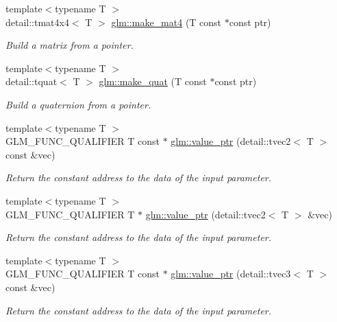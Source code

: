 \begin{DoxyCompactItemize}
{\footnotesize template$<$typename T $>$ }\\detail\-::tmat4x4$<$ T $>$ \hyperlink{group__gtc__type__ptr_ga723dd6241d4edf2ad48b25e5007054a7}{glm\-::make\-\_\-mat4} (T const $\ast$const ptr)
\begin{DoxyCompactList}\small\item\em Build a matrix from a pointer. \end{DoxyCompactList}\item 
{\footnotesize template$<$typename T $>$ }\\detail\-::tquat$<$ T $>$ \hyperlink{group__gtc__type__ptr_ga341b6592d08bc2e3871ceec05e0c060d}{glm\-::make\-\_\-quat} (T const $\ast$const ptr)
\begin{DoxyCompactList}\small\item\em Build a quaternion from a pointer. \end{DoxyCompactList}\item 
{\footnotesize template$<$typename T $>$ }\\G\-L\-M\-\_\-\-F\-U\-N\-C\-\_\-\-Q\-U\-A\-L\-I\-F\-I\-E\-R T const $\ast$ \hyperlink{group__gtc__type__ptr_ga57d829c43ef1f8bbe196343744392069}{glm\-::value\-\_\-ptr} (detail\-::tvec2$<$ T $>$ const \&vec)
\begin{DoxyCompactList}\small\item\em Return the constant address to the data of the input parameter. \end{DoxyCompactList}\item 
{\footnotesize template$<$typename T $>$ }\\G\-L\-M\-\_\-\-F\-U\-N\-C\-\_\-\-Q\-U\-A\-L\-I\-F\-I\-E\-R T $\ast$ \hyperlink{group__gtc__type__ptr_ga70900f03d3f6eead08cbeb8eebe2a596}{glm\-::value\-\_\-ptr} (detail\-::tvec2$<$ T $>$ \&vec)
\begin{DoxyCompactList}\small\item\em Return the constant address to the data of the input parameter. \end{DoxyCompactList}\item 
{\footnotesize template$<$typename T $>$ }\\G\-L\-M\-\_\-\-F\-U\-N\-C\-\_\-\-Q\-U\-A\-L\-I\-F\-I\-E\-R T const $\ast$ \hyperlink{group__gtc__type__ptr_ga10a568d24db822588013d8087b67eaad}{glm\-::value\-\_\-ptr} (detail\-::tvec3$<$ T $>$ const \&vec)
\begin{DoxyCompactList}\small\item\em Return the constant address to the data of the input parameter. \end{DoxyCompactList}\item 

\end{DoxyCompactItemize}
